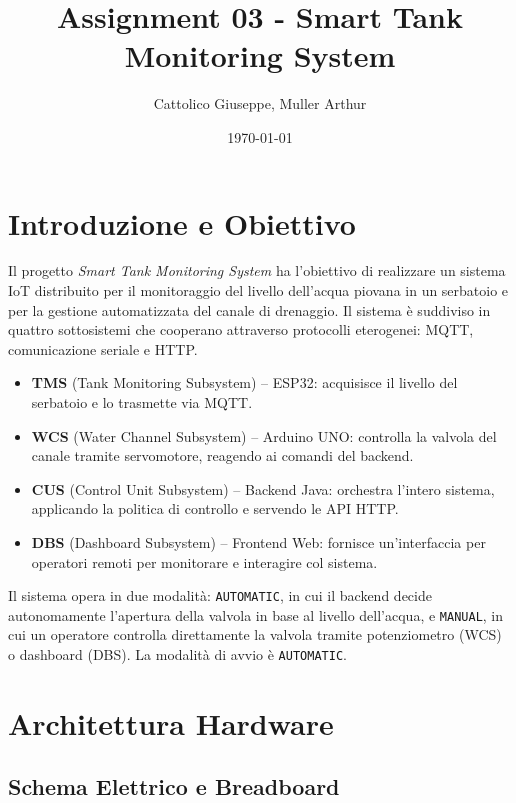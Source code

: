 \documentclass[12pt, a4paper]{article}
\title{\textbf{Assignment 03 - Smart Tank Monitoring System}}
\author{Cattolico Giuseppe, Muller Arthur}
\date{\today}
\begin{document}
\maketitle
\tableofcontents
\newpage

\section{Introduzione e Obiettivo}

Il progetto \textit{Smart Tank Monitoring System} ha l'obiettivo di realizzare un sistema IoT distribuito per il monitoraggio del livello dell'acqua piovana in un serbatoio e per la gestione automatizzata del canale di drenaggio. Il sistema è suddiviso in quattro sottosistemi che cooperano attraverso protocolli eterogenei: MQTT, comunicazione seriale e HTTP.

\begin{itemize}
    \item \textbf{TMS} (Tank Monitoring Subsystem) -- ESP32: acquisisce il livello del serbatoio e lo trasmette via MQTT.
    \item \textbf{WCS} (Water Channel Subsystem) -- Arduino UNO: controlla la valvola del canale tramite servomotore, reagendo ai comandi del backend.
    \item \textbf{CUS} (Control Unit Subsystem) -- Backend Java: orchestra l'intero sistema, applicando la politica di controllo e servendo le API HTTP.
    \item \textbf{DBS} (Dashboard Subsystem) -- Frontend Web: fornisce un'interfaccia per operatori remoti per monitorare e interagire col sistema.
\end{itemize}

Il sistema opera in due modalità: \texttt{AUTOMATIC}, in cui il backend decide autonomamente l'apertura della valvola in base al livello dell'acqua, e \texttt{MANUAL}, in cui un operatore controlla direttamente la valvola tramite potenziometro (WCS) o dashboard (DBS). La modalità di avvio è \texttt{AUTOMATIC}.

\newpage
\section{Architettura Hardware}

\subsection{Schema Elettrico e Breadboard}
\end{document}
